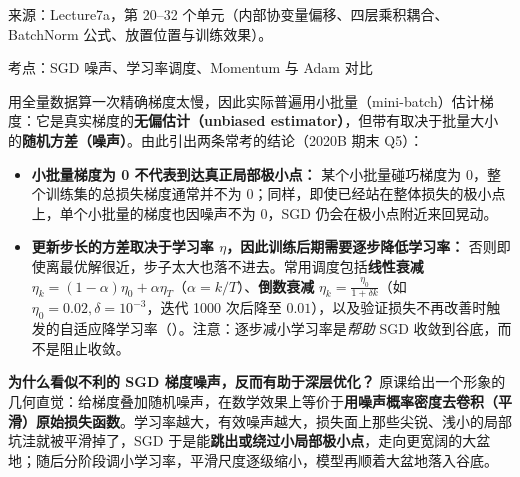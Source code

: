 来源：Lecture7a，第 20–32 个单元（内部协变量偏移、四层乘积耦合、BatchNorm 公式、放置位置与训练效果）。



考点：SGD 噪声、学习率调度、Momentum 与 Adam 对比 


用全量数据算一次精确梯度太慢，因此实际普遍用小批量（mini-batch）估计梯度：它是真实梯度的\textbf{无偏估计（unbiased estimator）}，但带有取决于批量大小的\textbf{随机方差（噪声）}。由此引出两条常考的结论（2020B 期末 Q5）：
\begin{itemize}
\item \textbf{小批量梯度为 0 不代表到达真正局部极小点：} 某个小批量碰巧梯度为 0，整个训练集的总损失梯度通常并不为 0；同样，即使已经站在整体损失的极小点上，单个小批量的梯度也因噪声不为 0，SGD 仍会在极小点附近来回晃动。
\item \textbf{更新步长的方差取决于学习率 $\eta$，因此训练后期需要逐步降低学习率：} 否则即使离最优解很近，步子太大也落不进去。常用调度包括\textbf{线性衰减} $\eta_k = (1-\alpha)\eta_0 + \alpha\eta_T$（$\alpha=k/T$）、\textbf{倒数衰减} $\eta_k = \frac{\eta_0}{1+\delta k}$（如 $\eta_0=0.02, \delta=10^{-3}$，迭代 1000 次后降至 $0.01$），以及验证损失不再改善时触发的自适应降学习率（）。注意：逐步减小学习率是\emph{帮助} SGD 收敛到谷底，而不是阻止收敛。
\end{itemize}

\textbf{为什么看似不利的 SGD 梯度噪声，反而有助于深层优化？} 原课给出一个形象的几何直觉：给梯度叠加随机噪声，在数学效果上等价于\textbf{用噪声概率密度去卷积（平滑）原始损失函数}。学习率越大，有效噪声越大，损失面上那些尖锐、浅小的局部坑洼就被平滑掉了，SGD 于是能\textbf{跳出或绕过小局部极小点}，走向更宽阔的大盆地；随后分阶段调小学习率，平滑尺度逐级缩小，模型再顺着大盆地落入谷底。


